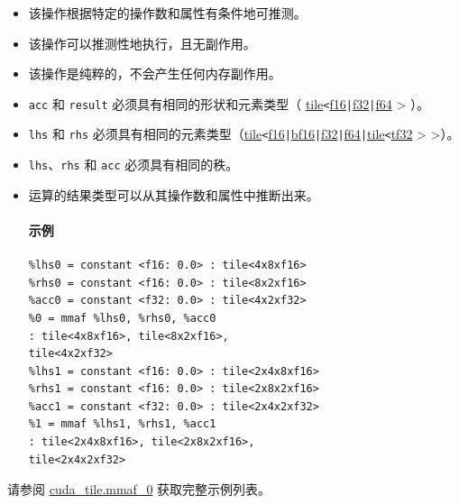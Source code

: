 \documentclass{article}
\begin{document}
\begin{itemize}
\item 该操作根据特定的操作数和属性有条件地可推测。
\item 该操作可以推测性地执行，且无副作用。
\item 该操作是纯粹的，不会产生任何内存副作用。
\item \texttt{acc} 和 \texttt{result} 必须具有相同的形状和元素类型（ \href{https://docs.nvidia.com/cuda/tile-ir/latest/sections/types.html#type-tile}{tile}\texttt{<}\href{https://docs.nvidia.com/cuda/tile-ir/latest/sections/types.html#subsection-element-types}{f16}\texttt{|}\href{https://docs.nvidia.com/cuda/tile-ir/latest/sections/types.html#subsection-element-types}{f32}\texttt{|}\href{https://docs.nvidia.com/cuda/tile-ir/latest/sections/types.html#subsection-element-types}{f64} > ）。
\item \texttt{lhs} 和 \texttt{rhs} 必须具有相同的元素类型（\href{https://docs.nvidia.com/cuda/tile-ir/latest/sections/types.html#type-tile}{tile}\texttt{<}\href{https://docs.nvidia.com/cuda/tile-ir/latest/sections/types.html#subsection-element-types}{f16}\texttt{|}\href{https://docs.nvidia.com/cuda/tile-ir/latest/sections/types.html#subsection-element-types}{bf16}\texttt{|}\href{https://docs.nvidia.com/cuda/tile-ir/latest/sections/types.html#subsection-element-types}{f32}\texttt{|}\href{https://docs.nvidia.com/cuda/tile-ir/latest/sections/types.html#subsection-element-types}{f64}\texttt{|}\href{https://docs.nvidia.com/cuda/tile-ir/latest/sections/types.html#type-tile}{tile}\texttt{<}\href{https://docs.nvidia.com/cuda/tile-ir/latest/sections/types.html#subsection-element-types}{tf32} > >）。
\item \texttt{lhs}、\texttt{rhs} 和 \texttt{acc} 必须具有相同的秩。
\item 运算的结果类型可以从其操作数和属性中推断出来。


\paragraph{示例}

\begin{lstlisting}
%lhs0 = constant <f16: 0.0> : tile<4x8xf16>
%rhs0 = constant <f16: 0.0> : tile<8x2xf16>
%acc0 = constant <f32: 0.0> : tile<4x2xf32>
%0 = mmaf %lhs0, %rhs0, %acc0
: tile<4x8xf16>, tile<8x2xf16>,
tile<4x2xf32>
%lhs1 = constant <f16: 0.0> : tile<2x4x8xf16>
%rhs1 = constant <f16: 0.0> : tile<2x8x2xf16>
%acc1 = constant <f32: 0.0> : tile<2x4x2xf32>
%1 = mmaf %lhs1, %rhs1, %acc1
: tile<2x4x8xf16>, tile<2x8x2xf16>,
tile<2x4x2xf32>
\end{lstlisting}

\end{itemize}
请参阅 \href{https://docs.nvidia.com/cuda/tile-ir/latest/sections/appendix.html#example-cuda-tile-mmaf-0}{cuda\_tile.mmaf\_0} 获取完整示例列表。
\end{document}
